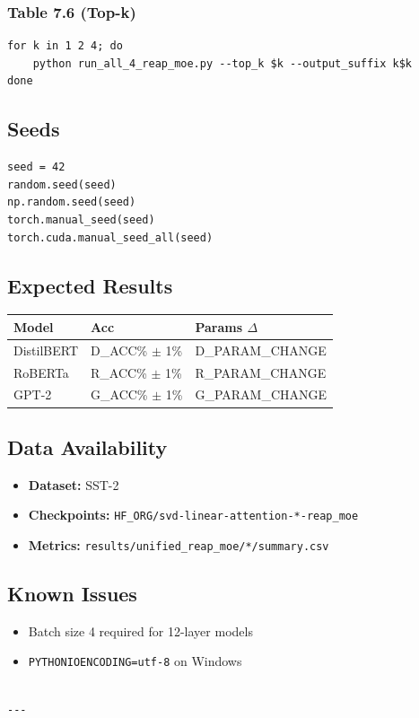 \subsubsection{Table 7.6 (Top-k)}
\begin{lstlisting}
for k in 1 2 4; do
    python run_all_4_reap_moe.py --top_k $k --output_suffix k$k
done
\end{lstlisting}

\subsection{Seeds}

\begin{lstlisting}
seed = 42
random.seed(seed)
np.random.seed(seed)
torch.manual_seed(seed)
torch.cuda.manual_seed_all(seed)
\end{lstlisting}

\subsection{Expected Results}

\begin{table}[H]
\centering
\small
\begin{tabular}{lll}
\toprule
\textbf{Model} & \textbf{Acc} & \textbf{Params $\Delta$} \\
\midrule
DistilBERT & {{D\_ACC}}\% $\pm$ 1\% & {{D\_PARAM\_CHANGE}} \\
RoBERTa & {{R\_ACC}}\% $\pm$ 1\% & {{R\_PARAM\_CHANGE}} \\
GPT-2 & {{G\_ACC}}\% $\pm$ 1\% & {{G\_PARAM\_CHANGE}} \\
\bottomrule
\end{tabular}
\end{table}

\subsection{Data Availability}

\begin{itemize}
\item \textbf{Dataset:} SST-2
\item \textbf{Checkpoints:} \texttt{{{HF\_ORG}}/svd-linear-attention-*-reap\_moe}
\item \textbf{Metrics:} \texttt{results/unified\_reap\_moe/*/summary.csv}

\end{itemize}
\subsection{Known Issues}

\begin{itemize}
\item Batch size 4 required for 12-layer models
\item \texttt{PYTHONIOENCODING=utf-8} on Windows
\end{itemize}
\begin{lstlisting}

---
\end{lstlisting}